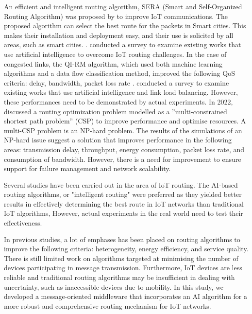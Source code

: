  An efficient and intelligent routing algorithm, SERA (Smart and Self-Organized Routing Algorithm) was proposed by 
 \cite{amrioui-Sofiane-Hamrioui-Camil-Lloret-Jaime-Lorenz-Pascal:2018} to improve IoT communications. The proposed algorithm can
select the best route for the packets in Smart cities. This makes their installation and deployment easy, and their use is solicited by all areas, such as smart cities.
 . \cite{Tlili-Sihem-Mnasri-Sami-Val-hierry:2022} conducted a survey to examine existing works that use artificial intelligence 
 to overcome IoT routing challenges. In the case of congested links, the QI-RM algorithm, which used both machine learning
algorithms and a data flow classification method, improved the following QoS criteria: delay, bandwidth, packet loss rate 
 \cite{sun2021qos:2021} 
 . \cite{Tlili-Sihem-Mnasri-Sami-Val-hierry:2022} conducted a survey to examine existing works that use artificial intelligence 
 and link load balancing. However, these performances need to be demonstrated by actual experiments. In 2022, 
 \cite{Tlili-Sihem-Mnasri-Sami-Val-hierry:2022} discussed
a routing optimization problem modelled as a ”multi-constrained shortest path problem” (CSP) to improve performance and optimise
 resources. A multi-CSP problem is an NP-hard problem. The results of the simulations of an NP-hard issue suggest a solution 
that improves performance in the following areas: transmission delay, throughput, energy consumption, packet loss rate,
and consumption of bandwidth. However, there is a need for improvement to ensure support for failure management and network 
scalability. 

Several studies have been carried out in the area of IoT routing. The AI-based routing algorithms, or "intelligent routing"
were preferred as they yielded better results in effectively determining the best route in IoT networks than traditional
IoT algorithms, However, actual experiments in the real world need to test their effectiveness. 

In previous studies, a lot of emphases has been placed on routing algorithms to improve the following criteria: heterogeneity,
energy efficiency, and service quality. There is still limited work on algorithms targeted at minimising the number of devices 
participating in message transmission. Furthermore, IoT devices are less reliable and traditional routing algorithms may be 
insufficient in dealing with uncertainty, such as inaccessible devices due to mobility. 
In this study, we developed a message-oriented middleware that incorporates an AI algorithm for a more robust and comprehensive 
routing mechanism for IoT networks.

